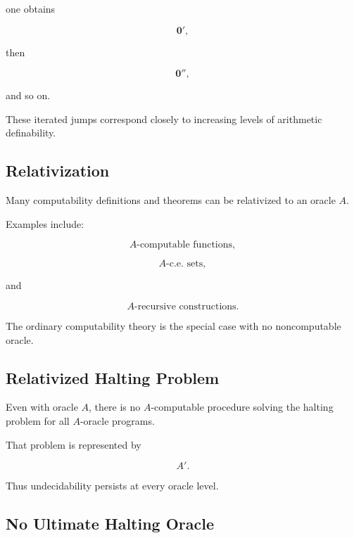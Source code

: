one obtains

\[
\boxed{
\mathbf{0}',
}
\]

then

\[
\boxed{
\mathbf{0}'',
}
\]

and so on.

These iterated jumps correspond closely to increasing levels of arithmetic
definability.

\subsection{Relativization}
\label{subsec:recursion-relativization}

Many computability definitions and theorems can be relativized to an oracle
\(A\).

Examples include:

\[
\boxed{
A\text{-computable functions},
}
\]

\[
\boxed{
A\text{-c.e.\ sets},
}
\]

and

\[
\boxed{
A\text{-recursive constructions}.
}
\]

The ordinary computability theory is the special case with no noncomputable
oracle.

\subsection{Relativized Halting Problem}
\label{subsec:relativized-halting-problem}

Even with oracle \(A\), there is no \(A\)-computable procedure solving the
halting problem for all \(A\)-oracle programs.

That problem is represented by

\[
A'.
\]

Thus undecidability persists at every oracle level.

\subsection{No Ultimate Halting Oracle}
\label{subsec:no-ultimate-halting-oracle}

